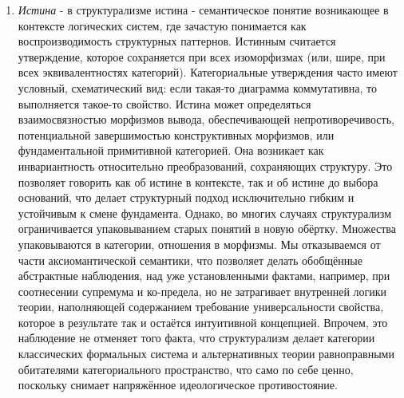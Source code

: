 \documentclass[12pt]{article}
\begin{document}
\begin{enumerate}
    \item {\it Истина} - в структурализме истина - семантическое понятие возникающее в контексте логических систем, где зачастую понимается как воспроизводимость структурных паттернов. Истинным считается утверждение, которое сохраняется при всех изоморфизмах (или, шире, при всех эквивалентностях категорий). Категориальные утверждения часто имеют условный, схематический вид: если такая-то диаграмма коммутативна, то выполняется такое-то свойство. Истина может определяться взаимосвязностью морфизмов вывода, обеспечивающей непротиворечивость, потенциальной завершимостью конструктивных морфизмов, или фундаментальной примитивной категорией. Она возникает как инвариантность относительно преобразований, сохраняющих структуру. Это позволяет говорить как об истине в контексте, так и об истине до выбора оснований, что делает структурный подход исключительно гибким и устойчивым к смене фундамента. Однако, во многих случаях структурализм ограничивается упаковыванием старых понятий в новую обёртку. Множества упаковываются в категории, отношения в морфизмы. Мы отказываемся от части аксиомантической семантики, что позволяет делать обобщённые абстрактные наблюдения, над уже установленными фактами, например, при соотнесении супремума и ко-предела, но не затрагивает внутренней логики теории, наполняющей содержанием требование универсальности свойства, которое в результате так и остаётся интуитивной концепцией. Впрочем, это наблюдение не отменяет того факта, что структурализм делает категории классических формальных система и альтернативных теории равноправными обитателями категориального пространство, что само по себе ценно, поскольку снимает напряжённое идеологическое противостояние.

\end{enumerate}
\end{document}
